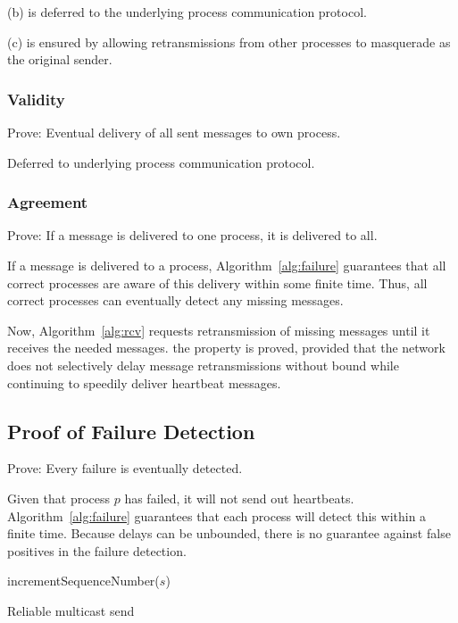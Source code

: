 \documentclass[]{article}
\begin{document}
(b) is deferred to the underlying process communication protocol.

(c) is ensured by allowing retransmissions from other processes to masquerade as the original sender.
\subsubsection{Validity}
Prove: Eventual delivery of all sent messages to own process.

Deferred to underlying process communication protocol.

\subsubsection{Agreement}
Prove: If a message is delivered to one process, it is delivered to all.

If a message is delivered to a process, Algorithm~\ref{alg:failure} guarantees that all correct processes are aware of this delivery within some finite time. Thus, all correct processes can eventually detect any missing messages.

Now, Algorithm~\ref{alg:rcv} requests retransmission of missing messages until it receives the needed messages.
the property is proved, provided that the network does not selectively delay message retransmissions without bound while continuing to speedily deliver heartbeat messages.

\subsection{Proof of Failure Detection}
Prove: Every failure is eventually detected.

Given that process $p$ has failed, it will not send out heartbeats. Algorithm~\ref{alg:failure} guarantees that each process will detect this within a finite time. Because delays can be unbounded, there is no guarantee against false positives in the failure detection.

\begin{algorithm}[t]
incrementSequenceNumber($s$)\;
\caption{Reliable multicast send}
\label{alg:send}
\end{algorithm}
\end{document}

